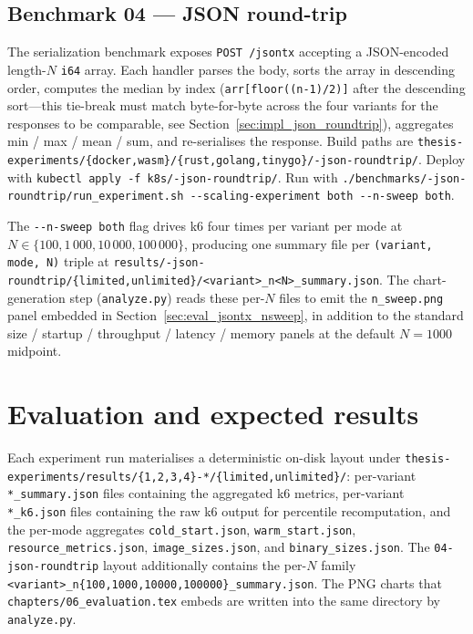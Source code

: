 \subsection{Benchmark 04 --- JSON round-trip}
\label{sec:repro_workflow_04}

\begin{sloppypar}
The serialization benchmark exposes \texttt{POST /jsontx} accepting a JSON-encoded length-$N$ \texttt{i64} array. Each handler parses the body, sorts the array in descending order, computes the median by index (\texttt{arr[floor((n-1)/2)]} after the descending sort---this tie-break must match byte-for-byte across the four variants for the responses to be comparable, see Section~\ref{sec:impl_json_roundtrip}), aggregates min / max / mean / sum, and re-serialises the response. Build paths are \texttt{thesis-experiments/\allowbreak\{docker,wasm\}/\allowbreak\{rust,golang,tinygo\}/-json-roundtrip/}. Deploy with \texttt{kubectl apply -f k8s/-json-roundtrip/}. Run with \texttt{./benchmarks/-json-roundtrip/\allowbreak run\_experiment.sh\allowbreak{} -{}-scaling-experiment both\allowbreak{} -{}-n-sweep both}.
\end{sloppypar}

\begin{sloppypar}
The \texttt{-{}-n-sweep both} flag drives k6 four times per variant per mode at $N \in \{100, 1\,000, 10\,000, 100\,000\}$, producing one summary file per \texttt{(variant, mode, N)} triple at \texttt{results/-json-roundtrip/\allowbreak\{limited,unlimited\}/\allowbreak<variant>\_n<N>\_summary.json}. The chart-generation step (\texttt{analyze.py}) reads these per-$N$ files to emit the \texttt{n\_sweep.png} panel embedded in Section~\ref{sec:eval_jsontx_nsweep}, in addition to the standard size / startup / throughput / latency / memory panels at the default $N=1000$ midpoint.
\end{sloppypar}

\section{Evaluation and expected results}
\label{sec:repro_evaluation}

\begin{sloppypar}
Each experiment run materialises a deterministic on-disk layout under \texttt{thesis-experiments/\allowbreak results/\{1,2,3,4\}-*/\allowbreak\{limited,unlimited\}/}: per-variant \texttt{*\_summary.json} files containing the aggregated k6 metrics, per-variant \texttt{*\_k6.json} files containing the raw k6 output for percentile recomputation, and the per-mode aggregates \texttt{cold\_start.json}, \texttt{warm\_start.json}, \texttt{resource\_metrics.json}, \texttt{image\_sizes.json}, and \texttt{binary\_sizes.json}. The \texttt{04-json-roundtrip} layout additionally contains the per-$N$ family \texttt{<variant>\_n\allowbreak\{100,1000,10000,100000\}\_summary.json}. The PNG charts that \texttt{chapters/06\_evaluation.tex} embeds are written into the same directory by \texttt{analyze.py}.
\end{sloppypar}

